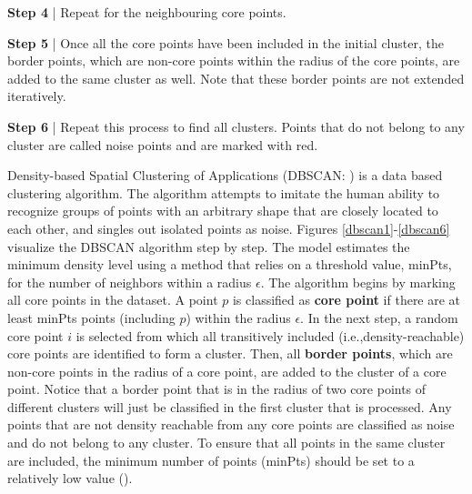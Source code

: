 \begin{marginfigure}
\centering

\vspace{0.1cm}
\caption{\textbf{Step 4} | Repeat for the neighbouring core points.}
\label{dbscan4} 
\end{marginfigure}

\begin{marginfigure}
\centering

\vspace{0.1cm}
\caption{\textbf{Step 5} | Once all the core points have been included in the initial cluster, the border points, which are non-core points within the radius of the core points, are added to the same cluster as well. Note that these border points are not extended iteratively.}
\label{dbscan5} 
\end{marginfigure}

\begin{marginfigure}
\centering

\vspace{0.1cm}
\caption{\textbf{Step 6} | Repeat this process to find all clusters. Points that do not belong to any cluster are called noise points and are marked with red.}
\label{dbscan6} 
\end{marginfigure}
Density-based Spatial Clustering of Applications (DBSCAN: \cite{ester_density-based_1996}) is a data based clustering algorithm. The algorithm attempts to imitate the human ability to recognize groups of points with an arbitrary shape that are closely located to each other, and singles out isolated points as noise.
Figures \ref{dbscan1}-\ref{dbscan6} visualize the DBSCAN algorithm step by step.
The model estimates the minimum density level using a method that relies on a threshold value, minPts, for the number of neighbors within a radius $\epsilon$. The algorithm begins by marking all core points in the dataset. A point $p$ is classified as \textbf{core point} if there are at least minPts points (including $p$) within the radius $\epsilon$. In the next step, a random core point $i$ is selected from which all transitively included (i.e.,density-reachable) core points are identified to form a cluster. Then, all \textbf{border points}, which are non-core points in the radius of a core point, are added to the cluster of a core point. Notice that a border point that is in the radius of two core points of different clusters will just be classified in the first cluster that is processed. Any points that are not density reachable from any core points are classified as noise and do not belong to any cluster. To ensure that all points in the same cluster are included, the minimum number of points (minPts) should be set to a relatively low value (\cite{ester_density-based_1996, schubert_dbscan_2017}).



